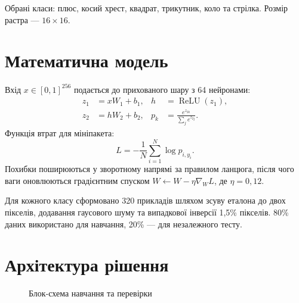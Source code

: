 \documentclass[12pt,a4paper]{article}
\begin{document}
Обрані класи: плюс, косий хрест, квадрат, трикутник, коло та стрілка. Розмір растра --- $16\times16$.

\section{Математична модель}
Вхід $x\in[0,1]^{256}$ подається до прихованого шару з 64 нейронами:
\begin{align}
z_1&=xW_1+b_1, & h&=\operatorname{ReLU}(z_1),\\
z_2&=hW_2+b_2, & p_k&=\frac{e^{z_{2k}}}{\sum_j e^{z_{2j}}}.
\end{align}
Функція втрат для мініпакета:
\begin{equation}L=-\frac1N\sum_{i=1}^{N}\log p_{i,y_i}.\end{equation}
Похибки поширюються у зворотному напрямі за правилом ланцюга, після чого ваги оновлюються градієнтним спуском $W\leftarrow W-\eta\nabla_WL$, де $\eta=0{,}12$.

Для кожного класу сформовано 320 прикладів шляхом зсуву еталона до двох пікселів, додавання гаусового шуму та випадкової інверсії 1,5\% пікселів. 80\% даних використано для навчання, 20\% --- для незалежного тесту.

\section{Архітектура рішення}
\begin{figure}[H]\centering
{}\caption{Блок-схема навчання та перевірки}
\end{figure}
\end{document}
